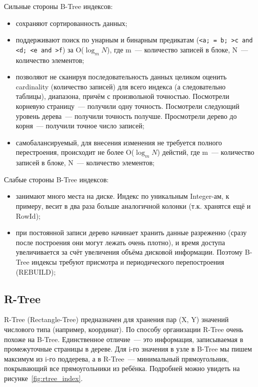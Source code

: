 Сильные стороны B-Tree индексов:

\begin{itemize}
  \item сохраняют сортированность данных;
  \item поддерживают поиск по унарным и бинарным предикатам (\lstinline!<a; = b; >c and <d; <e and >f!) за O($\log_m{N}$), где m~--- количество записей в блоке, N~--- количество элементов;
  \item позволяют не сканируя последовательность данных целиком оценить cardinality (количество записей) для всего индекса (а следовательно таблицы), диапазона, причём с произвольной точностью. Посмотрели корневую страницу~--- получили одну точность. Посмотрели следующий уровень дерева~--- получили точность получше. Просмотрели дерево до корня~--- получили точное число записей;
  \item самобалансируемый, для внесения изменения не требуется полного перестроения, происходит не более O($\log_m{N}$) дейстий, где m~--- количество записей в блоке, N~--- количество элементов;
\end{itemize}

Слабые стороны B-Tree индексов:

\begin{itemize}
  \item занимают много места на диске. Индекс по уникальным Integer-ам, к примеру, весит в два раза больше аналогичной колонки (т.к. хранятся ещё и RowId);
  \item при постоянной записи дерево начинает хранить данные разреженно (сразу после построения они могут лежать очень плотно), и время доступа увеличивается за счёт увеличения объёма дисковой информации. Поэтому B-Tree индексы требуют присмотра и периодического перепостроения (REBUILD);
\end{itemize}



\subsection{R-Tree}

R-Tree (Rectangle-Tree) предназначен для хранения пар (X, Y) значений числового типа (например, координат). По способу организации R-Tree очень похоже на B-Tree. Единственное отличие~--- это информация, записываемая в промежуточные страницы в дереве. Для i-го значения в узле в B-Tree мы пишем максимум из i-го поддерева, а в R-Tree~--- минимальный прямоугольник, покрывающий все прямоугольники из ребёнка. Подробней можно увидеть на рисунке~\ref{fig:rtree_index}.

